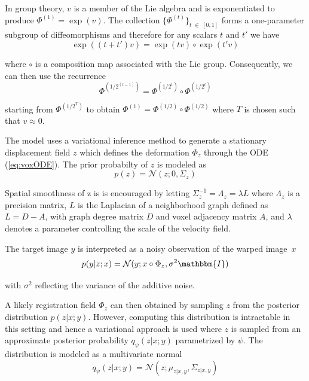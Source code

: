 In group theory, $v$ is a member of the Lie algebra and is exponentiated to produce $\Phi^{(1)} = \exp(v)$.
The collection $\{\Phi^{(t)}\}_{t \; \in \; [0,1]}$ forms a one-parameter subgroup of diffeomorphisms and therefore for any scalars $t$ and $t'$ we have 
\begin{equation} \label{eq:voxoneparamsubgroup}
	\exp((t + t')v) = \exp(tv) \circ \exp(t'v)
\end{equation}

where $\circ$ is a composition map associated with the Lie group. Consequently, we can then use the recurrence
\begin{equation} \label{eq:voxrecurrence}
	\Phi^{(1/2^{(t-1)})} = \Phi^{(1/2^{t})} \circ \Phi^{(1/2^{t})}
\end{equation}

starting from $\Phi^{(1/2^T)}$ to obtain $\Phi^{(1)} = \Phi^{(1/2)} \circ \Phi^{(1/2)}$ where $T$ is chosen such that $v \approx 0$.

The model uses a variational inference method to generate a stationary displacement field $z$ which defines the deformation $\Phi_z$ through the ODE (\ref{eq:voxODE}). The prior probabilty of $z$ is modeled as
\begin{equation}
	p(z) = \mathcal{N}(z; 0, \Sigma_z)
\end{equation}

Spatial smoothness of z is is encouraged by letting ${\Sigma_z^{-1} = \Lambda_z = \lambda L}$ where $\Lambda_z$ is a precision matrix, $L$ is the Laplacian of a neighborhood graph defined as $L = D - A$, with graph degree matrix $D$ and voxel adjacency matrix $A$, and $\lambda$ denotes a parameter controlling the scale of the velocity field.

The target image $y$ is interpreted as a noisy observation of the warped image~$x$
\begin{equation}
	p(y|z;x) = \mathcal{N}(y; x \circ \Phi_z, \sigma^2 \mathbbm{I})
\end{equation}

with $\sigma^2$ reflecting the variance of the additive noise.

A likely registration field $\Phi_z$ can then obtained by sampling $z$ from the posterior distribution $p(z | x; y)$.
However, computing this distribution is intractable in this setting and hence a variational approach is used where $z$ is sampled from an approximate posterior probability $q_\psi(z | x; y)$ parametrized by $\psi$. The distribution is modeled as a multivariate normal
\begin{equation}
	q_\psi(z | x; y) = \mathcal{N}(z; \mu_{z | x, y}, \Sigma_{z | x, y})
\end{equation}

